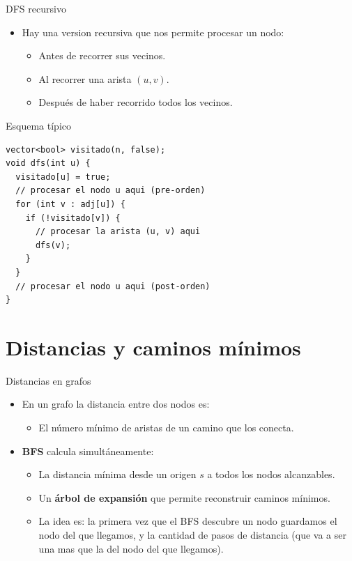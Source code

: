 \documentclass[aspectratio=169]{beamer}
\begin{document}
\begin{frame}[fragile]{DFS recursivo}
  \begin{itemize}
    \item Hay una version recursiva que nos permite procesar un nodo:
      \begin{itemize}
        \item Antes de recorrer sus vecinos.
        \item Al recorrer una arista \((u, v)\).
        \item Después de haber recorrido todos los vecinos.
      \end{itemize}
  \end{itemize}
  \begin{block}{Esquema típico}
  \begin{lstlisting}[style=customc]
vector<bool> visitado(n, false);
void dfs(int u) {
  visitado[u] = true;
  // procesar el nodo u aqui (pre-orden)
  for (int v : adj[u]) {
    if (!visitado[v]) {
      // procesar la arista (u, v) aqui
      dfs(v);
    }
  }
  // procesar el nodo u aqui (post-orden)
}\end{lstlisting}
  \end{block}
\end{frame}

\section{Distancias y caminos mínimos}

\begin{frame}{Distancias en grafos}
  \begin{itemize}
    \item En un grafo la distancia entre dos nodos es:
      \begin{itemize}
        \item El número mínimo de aristas de un camino que los conecta.
      \end{itemize}
    \item \textbf{BFS} calcula simultáneamente:
      \begin{itemize}
        \item La distancia mínima desde un origen \(s\) a todos los nodos alcanzables.
        \item Un \textbf{árbol de expansión} que permite reconstruir caminos mínimos.
        \item La idea es: la primera vez que el BFS descubre un nodo guardamos el nodo del que llegamos, y la cantidad de pasos de distancia (que va a ser una mas que la del nodo del que llegamos).
      \end{itemize}
  \end{itemize}
\end{frame}
\end{document}
